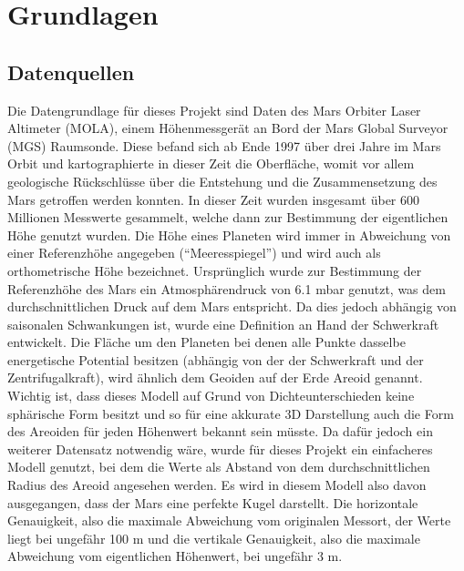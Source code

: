 \chapter{Grundlagen}\label{chapter2}

\section{Datenquellen}
Die Datengrundlage für dieses Projekt sind Daten des Mars Orbiter Laser Altimeter (MOLA), einem Höhenmessgerät an Bord der Mars Global Surveyor (MGS) Raumsonde. Diese befand sich ab Ende 1997 über drei Jahre im Mars Orbit und kartographierte in dieser Zeit die Oberfläche, womit vor allem geologische Rückschlüsse über die Entstehung und die Zusammensetzung des Mars getroffen werden konnten. In dieser Zeit wurden insgesamt über 600 Millionen Messwerte gesammelt, welche dann zur Bestimmung der eigentlichen Höhe genutzt wurden. Die Höhe eines Planeten wird immer in Abweichung von einer Referenzhöhe angegeben (“Meeresspiegel”) und wird auch als orthometrische Höhe bezeichnet. Ursprünglich wurde zur Bestimmung der Referenzhöhe des Mars ein Atmosphärendruck von 6.1 mbar genutzt, was dem durchschnittlichen Druck auf dem Mars entspricht. Da dies jedoch abhängig von saisonalen Schwankungen ist, wurde eine Definition an Hand der Schwerkraft entwickelt. Die Fläche um den Planeten bei denen alle Punkte dasselbe energetische Potential besitzen (abhängig von der der Schwerkraft und der Zentrifugalkraft), wird ähnlich dem Geoiden auf der Erde Areoid genannt. Wichtig ist, dass dieses Modell auf Grund von Dichteunterschieden keine sphärische Form besitzt und so für eine akkurate 3D Darstellung auch die Form des Areoiden für jeden Höhenwert bekannt sein müsste. Da dafür jedoch ein weiterer Datensatz notwendig wäre, wurde für dieses Projekt ein einfacheres Modell genutzt, bei dem die Werte als Abstand von dem durchschnittlichen Radius des Areoid angesehen werden. Es wird in diesem Modell also davon ausgegangen, dass der Mars eine perfekte Kugel darstellt. Die horizontale Genauigkeit, also die maximale Abweichung vom originalen Messort, der Werte liegt bei ungefähr 100 m und die vertikale Genauigkeit, also die maximale Abweichung vom eigentlichen Höhenwert, bei ungefähr 3 m. 

